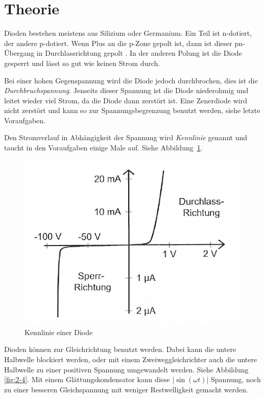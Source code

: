 
\FloatBarrier
\section{Theorie}

Dioden bestehen meistens aus Silizium oder Germanium. Ein Teil ist n-dotiert,
der andere p-dotiert. Wenn Plus an die p-Zone gepolt ist, dann ist dieser
pn-Übergang in Durchlassrichtung gepolt
\cite[§14.1]{beuth/elementare_elektronik}. In der anderen Polung ist die
Diode gesperrt und lässt so gut wie keinen Strom durch.

Bei einer hohen Gegenspannung wird die Diode jedoch durchbrochen, dies ist die
\emph{Durchbruchspannung}. Jenseits dieser Spannung ist die Diode niederohmig
und leitet wieder viel Strom, da die Diode dann zerstört ist. Eine Zenerdiode
wird nicht zerstört und kann so zur Spannungsbegrenzung benutzt werden, siehe
letzte Voraufgaben.

Den Stromverlauf in Abhängigkeit der Spannung wird \emph{Kennlinie} genannt und
taucht in den Voraufgaben einige Male auf. Siehe Abbildung~\ref{fig:2-2}.

\begin{figure}[htbp]
	\centering
	\caption{%
		Kennlinie einer Diode \cite[Abbildung~2.2]{physik313-Anleitung}
	}
	\label{fig:2-2}
	\includegraphics[width=.45\linewidth]{Bilder_aus_Anleitung/2-2.png}
\end{figure}

Dioden können zur Gleichrichtung benutzt werden. Dabei kann die untere
Halbwelle blockiert werden, oder mit einem Zweiweggleichrichter auch die untere
Halbwelle zu einer positiven Spannung umgewandelt werden. Siehe Abbildung
\ref{fig:2-4}. Mit einem Glättungskondensator kann diese $|\sin(\omega t)|$
Spannung, noch zu einer besseren Gleichspannung mit weniger Restwelligkeit
gemacht werden.

